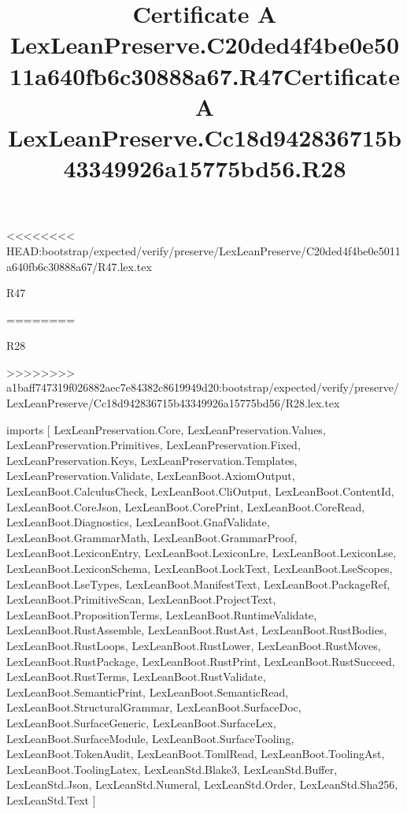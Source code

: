 <<<<<<<< HEAD:bootstrap/expected/verify/preserve/LexLeanPreserve/C20ded4f4be0e5011a640fb6c30888a67/R47.lex.tex
\begin{lexlean}{R47}
\title{Certificate A LexLeanPreserve.C20ded4f4be0e5011a640fb6c30888a67.R47}
========
\begin{lexlean}{R28}
\title{Certificate A LexLeanPreserve.Cc18d942836715b43349926a15775bd56.R28}
>>>>>>>> a1baff747319f026882aec7e84382c8619949d20:bootstrap/expected/verify/preserve/LexLeanPreserve/Cc18d942836715b43349926a15775bd56/R28.lex.tex
\begin{coremodule}
imports [
  LexLeanPreservation.Core,
  LexLeanPreservation.Values,
  LexLeanPreservation.Primitives,
  LexLeanPreservation.Fixed,
  LexLeanPreservation.Keys,
  LexLeanPreservation.Templates,
  LexLeanPreservation.Validate,
  LexLeanBoot.AxiomOutput,
  LexLeanBoot.CalculusCheck,
  LexLeanBoot.CliOutput,
  LexLeanBoot.ContentId,
  LexLeanBoot.CoreJson,
  LexLeanBoot.CorePrint,
  LexLeanBoot.CoreRead,
  LexLeanBoot.Diagnostics,
  LexLeanBoot.GnafValidate,
  LexLeanBoot.GrammarMath,
  LexLeanBoot.GrammarProof,
  LexLeanBoot.LexiconEntry,
  LexLeanBoot.LexiconLre,
  LexLeanBoot.LexiconLse,
  LexLeanBoot.LexiconSchema,
  LexLeanBoot.LockText,
  LexLeanBoot.LseScopes,
  LexLeanBoot.LseTypes,
  LexLeanBoot.ManifestText,
  LexLeanBoot.PackageRef,
  LexLeanBoot.PrimitiveScan,
  LexLeanBoot.ProjectText,
  LexLeanBoot.PropositionTerms,
  LexLeanBoot.RuntimeValidate,
  LexLeanBoot.RustAssemble,
  LexLeanBoot.RustAst,
  LexLeanBoot.RustBodies,
  LexLeanBoot.RustLoops,
  LexLeanBoot.RustLower,
  LexLeanBoot.RustMoves,
  LexLeanBoot.RustPackage,
  LexLeanBoot.RustPrint,
  LexLeanBoot.RustSucceed,
  LexLeanBoot.RustTerms,
  LexLeanBoot.RustValidate,
  LexLeanBoot.SemanticPrint,
  LexLeanBoot.SemanticRead,
  LexLeanBoot.StructuralGrammar,
  LexLeanBoot.SurfaceDoc,
  LexLeanBoot.SurfaceGeneric,
  LexLeanBoot.SurfaceLex,
  LexLeanBoot.SurfaceModule,
  LexLeanBoot.SurfaceTooling,
  LexLeanBoot.TokenAudit,
  LexLeanBoot.TomlRead,
  LexLeanBoot.ToolingAst,
  LexLeanBoot.ToolingLatex,
  LexLeanStd.Blake3,
  LexLeanStd.Buffer,
  LexLeanStd.Json,
  LexLeanStd.Numeral,
  LexLeanStd.Order,
  LexLeanStd.Sha256,
  LexLeanStd.Text
]


\end{coremodule}
\end{lexlean}
\end{lexlean}

